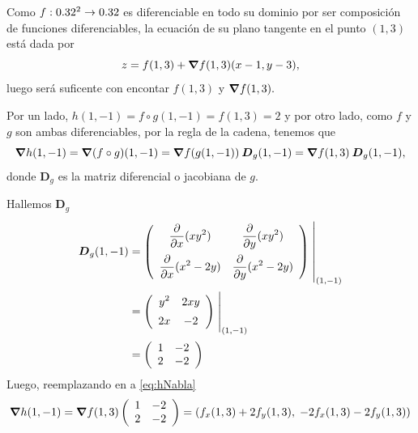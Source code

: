 \newpage
\begin{solution}

    Como   $f:0.32^2\to0.32$ es diferenciable en todo su dominio por ser composición de funciones diferenciables,  la ecuaci\'on de su plano tangente en el punto $(1,3)$ est\'a dada por
    \begin{equation}
        z= f(1,3) + \grad f(1,3) (x-1,y-3),  \label{eq:zNabla}
    \end{equation}   luego ser\'a  suficente con encontar $ f(1,3)$ y $\grad f(1,3).$

    Por un lado,      $h(1,-1)= f\circ g (1,-1) =  f(1,3)=2$  y por otro lado,  como $f$ y $g$ son ambas diferenciables,  por la regla de la cadena,  tenemos que
    \begin{equation}
        \grad h(1,-1)=\grad (f\circ g)(1,-1)=\grad f(g(1,-1)) \:\boldsymbol{D}_g(1,-1) = \grad f (1,3) \:\boldsymbol{D}_g(1,-1),  \label{eq:hNabla}
    \end{equation}    donde $\boldsymbol{D}_g$ es la matriz diferencial o  jacobiana de $g$.

    \noindent  Hallemos $\boldsymbol{D}_g$
    \begin{align*}
        \boldsymbol{D}_g(1,-1) & =
        \left(\begin{array}{cc}
                      \displaystyle\partialx (xy^2)            & \displaystyle\partialy (xy^2)           \\[10pt]
                      \displaystyle\partialx  (x^2 -2y) & \displaystyle\partialy (x^2 -2y)
                  \end{array}\right)\left.\rule{0pt}{1.1cm}\right\rvert_{(1,-1)}             \\[2pt]
                              & =\left(\begin{array}{cc}
                                               \displaystyle y^2                 & \displaystyle 2xy              \\[5pt]
                                               \displaystyle   2x & \displaystyle -2
                                           \end{array}\right)\left.\rule{0pt}{0.7cm}\right\rvert_{(1,-1)} \\[2pt]
                              & =\left(\begin{array}{cc}
                                               1    & -2    \\
                                               2 & -2
                                           \end{array}\right)
    \end{align*}
    Luego, reemplazando en  a   \eqref{eq:hNabla}
    \[
        \grad h(1,-1) = \grad f(1,3)\left(\begin{array}{cc}
                1   & -2    \\
                2 & -2
            \end{array}\right) = \left(f_x(1,3) + 2f_y(1,3),\;-2f_x(1,3)-2f_y(1,3)\right)
    \]


\end{solution}

